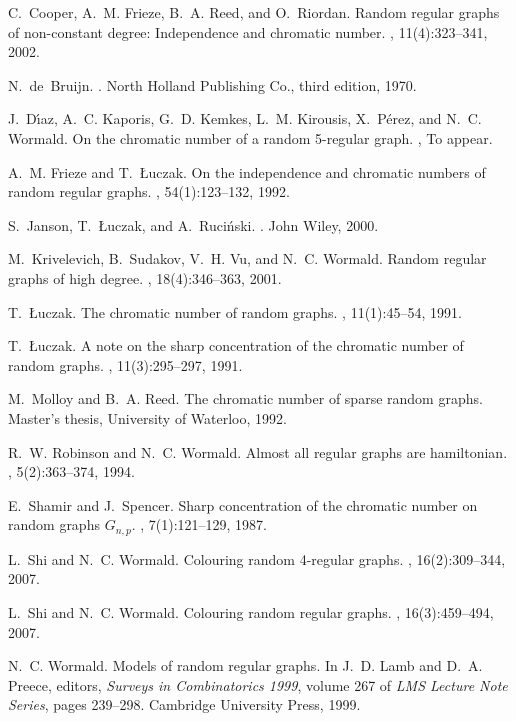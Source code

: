 \documentclass[12pt]{article}
\begin{document}
\begin{thebibliography}{10}
C.~Cooper, A.~M. Frieze, B.~A. Reed, and O.~Riordan.
\newblock Random regular graphs of non-constant degree: Independence and
  chromatic number.
, 11(4):323--341, 2002.

N.~de~Bruijn.
.
\newblock North Holland Publishing Co., third edition, 1970.

J.~D{\' \i}az, A.~C. Kaporis, G.~D. Kemkes, L.~M. Kirousis, X.~P{\' e}rez, and
  N.~C. Wormald.
\newblock On the chromatic number of a random 5-regular graph.
, To appear.

A.~M. Frieze and T.~{\L}uczak.
\newblock On the independence and chromatic numbers of random regular graphs.
, 54(1):123--132, 1992.

S.~Janson, T.~{\L}uczak, and A.~Ruci{\' n}ski.
.
\newblock John Wiley, 2000.

M.~Krivelevich, B.~Sudakov, V.~H. Vu, and N.~C. Wormald.
\newblock Random regular graphs of high degree.
, 18(4):346--363, 2001.

T.~{\L}uczak.
\newblock The chromatic number of random graphs.
, 11(1):45--54, 1991.

T.~{\L}uczak.
\newblock A note on the sharp concentration of the chromatic number of random
  graphs.
, 11(3):295--297, 1991.

M.~Molloy and B.~A. Reed.
\newblock The chromatic number of sparse random graphs.
\newblock Master's thesis, University of Waterloo, 1992.

R.~W. Robinson and N.~C. Wormald.
\newblock Almost all regular graphs are hamiltonian.
, 5(2):363--374, 1994.

E.~Shamir and J.~Spencer.
\newblock Sharp concentration of the chromatic number on random graphs {$G_{n,
  p}$}.
, 7(1):121--129, 1987.

L.~Shi and N.~C. Wormald.
\newblock Colouring random 4-regular graphs.
, 16(2):309--344, 2007.

L.~Shi and N.~C. Wormald.
\newblock Colouring random regular graphs.
, 16(3):459--494, 2007.

N.~C. Wormald.
\newblock Models of random regular graphs.
\newblock In J.~D. Lamb and D.~A. Preece, editors, {\em Surveys in
  Combinatorics 1999}, volume 267 of {\em LMS Lecture Note Series}, pages
  239--298. Cambridge University Press, 1999.

\end{thebibliography}
\end{document}
